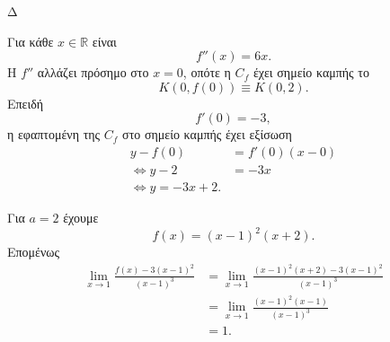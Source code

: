 \begin{thema}{Δ}
\begin{erwthma}
Για κάθε $x\in\mathbb{R}$ είναι
\[
f''(x)=6x.
\]
Η $f''$ αλλάζει πρόσημο στο $x=0$, οπότε η $C_f$ έχει σημείο καμπής το
\[
K(0,f(0))\equiv K(0,2).
\]
Επειδή
\[
f'(0)=-3,
\]
η εφαπτομένη της $C_f$ στο σημείο καμπής έχει εξίσωση
\begin{align*}
y-f(0)&=f'(0)(x-0)\\
\Leftrightarrow y-2&=-3x\\
\Leftrightarrow {y=-3x+2}.
\end{align*}

\item Για $a=2$ έχουμε
\[
f(x)=(x-1)^2(x+2).
\]
Επομένως
\begin{align*}
\lim_{x\to1}\frac{f(x)-3(x-1)^2}{(x-1)^3}
&=\lim_{x\to1}
\frac{(x-1)^2(x+2)-3(x-1)^2}{(x-1)^3}\\
&=\lim_{x\to1}
\frac{(x-1)^2(x-1)}{(x-1)^3}\\
&={1}.
\end{align*}
\end{erwthma}
\end{thema}

